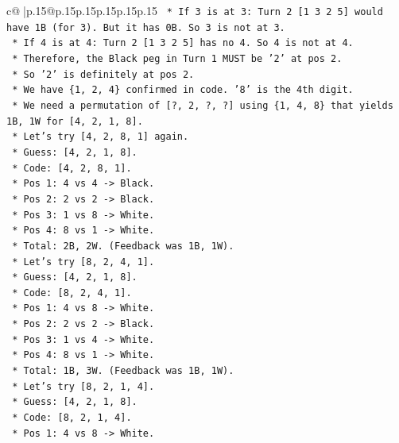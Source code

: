 \documentclass{article}
\begin{document}
{\begin{supertabular}{c@{$\;$}|p{.15\linewidth}@{}p{.15\linewidth}p{.15\linewidth}p{.15\linewidth}p{.15\linewidth}p{.15\linewidth}}
{{{\texttt{            *   If 3 is at 3: Turn 2 {[}1 3 2 5{]} would have 1B (for 3). But it has 0B. So 3 is not at 3.} \\
\texttt{            *   If 4 is at 4: Turn 2 {[}1 3 2 5{]} has no 4. So 4 is not at 4.} \\
\texttt{            *   Therefore, the Black peg in Turn 1 MUST be '2' at pos 2.} \\
\texttt{    *   So '2' is definitely at pos 2.} \\
\texttt{    *   We have \{1, 2, 4\} confirmed in code. '8' is the 4th digit.} \\
\texttt{    *   We need a permutation of {[}?, 2, ?, ?{]} using \{1, 4, 8\} that yields 1B, 1W for {[}4, 2, 1, 8{]}.} \\
\texttt{    *   Let's try {[}4, 2, 8, 1{]} again.} \\
\texttt{        *   Guess: {[}4, 2, 1, 8{]}.} \\
\texttt{        *   Code: {[}4, 2, 8, 1{]}.} \\
\texttt{        *   Pos 1: 4 vs 4 {-}> Black.} \\
\texttt{        *   Pos 2: 2 vs 2 {-}> Black.} \\
\texttt{        *   Pos 3: 1 vs 8 {-}> White.} \\
\texttt{        *   Pos 4: 8 vs 1 {-}> White.} \\
\texttt{        *   Total: 2B, 2W. (Feedback was 1B, 1W).} \\
\texttt{    *   Let's try {[}8, 2, 4, 1{]}.} \\
\texttt{        *   Guess: {[}4, 2, 1, 8{]}.} \\
\texttt{        *   Code: {[}8, 2, 4, 1{]}.} \\
\texttt{        *   Pos 1: 4 vs 8 {-}> White.} \\
\texttt{        *   Pos 2: 2 vs 2 {-}> Black.} \\
\texttt{        *   Pos 3: 1 vs 4 {-}> White.} \\
\texttt{        *   Pos 4: 8 vs 1 {-}> White.} \\
\texttt{        *   Total: 1B, 3W. (Feedback was 1B, 1W).} \\
\texttt{    *   Let's try {[}8, 2, 1, 4{]}.} \\
\texttt{        *   Guess: {[}4, 2, 1, 8{]}.} \\
\texttt{        *   Code: {[}8, 2, 1, 4{]}.} \\
\texttt{        *   Pos 1: 4 vs 8 {-}> White.} \\
}}}
\end{supertabular}}
\end{document}
